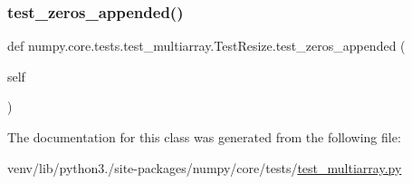 \mbox{\label{classnumpy_1_1core_1_1tests_1_1test__multiarray_1_1TestResize_a55bf09cacb878be736025bcd98a21c0e}} 
\subsubsection{\texorpdfstring{test\+\_\+zeros\+\_\+appended()}{test\_zeros\_appended()}}
{\footnotesize\ttfamily def numpy.\+core.\+tests.\+test\+\_\+multiarray.\+Test\+Resize.\+test\+\_\+zeros\+\_\+appended (\begin{DoxyParamCaption}\item[{}]{self }\end{DoxyParamCaption})}



The documentation for this class was generated from the following file\+:\begin{DoxyCompactItemize}
\item 
venv/lib/python3./site-\/packages/numpy/core/tests/\hyperlink{core_2tests_2test__multiarray_8py}{test\+\_\+multiarray.\+py}\end{DoxyCompactItemize}
